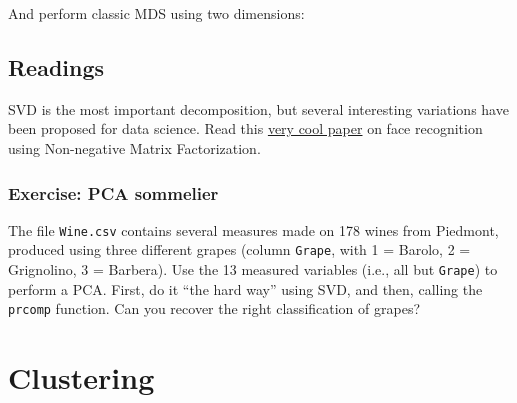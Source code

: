 \documentclass[
  letterpaper,
  DIV=11,
  numbers=noendperiod]{scrreprt}
\newenvironment{Shaded}{\begin{snugshade}}{\end{snugshade}}
\newcommand{\NormalTok}[1]{\textcolor[rgb]{0.00,0.23,0.31}{#1}}
\begin{document}
And perform classic MDS using two dimensions:

\begin{Shaded}
\end{Shaded}

\section{Readings}\label{readings-1}

SVD is the most important decomposition, but several interesting
variations have been proposed for data science. Read this
\href{http://www.columbia.edu/~jwp2128/Teaching/E4903/papers/nmf_nature.pdf}{very
cool paper} on face recognition using Non-negative Matrix Factorization.

\subsection{Exercise: PCA sommelier}\label{exercise-pca-sommelier}

The file \texttt{Wine.csv} contains several measures made on 178 wines
from Piedmont, produced using three different grapes (column
\texttt{Grape}, with 1 = Barolo, 2 = Grignolino, 3 = Barbera). Use the
13 measured variables (i.e., all but \texttt{Grape}) to perform a PCA.
First, do it ``the hard way'' using SVD, and then, calling the
\texttt{prcomp} function. Can you recover the right classification of
grapes?


\chapter{Clustering}\label{clustering}
\end{document}
